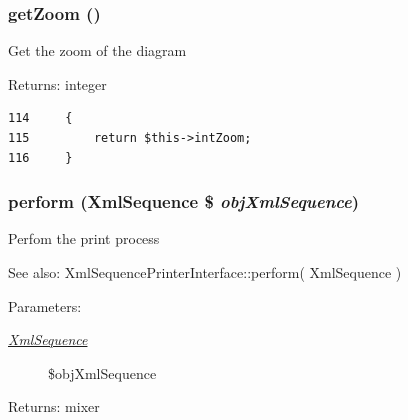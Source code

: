 \hypertarget{class_xml_sequence_printer_diagram_f14ce9063b029367062cfca60b3236af}{
\subsubsection[{getZoom}]{\setlength{\rightskip}{0pt plus 5cm}getZoom ()}}
\label{class_xml_sequence_printer_diagram_f14ce9063b029367062cfca60b3236af}


Get the zoom of the diagram

\begin{Desc}
\item[Returns:]integer \end{Desc}


\begin{Code}\begin{verbatim}114     {
115         return $this->intZoom;
116     }
\end{verbatim}
\end{Code}


\hypertarget{class_xml_sequence_printer_diagram_7a8a4630e9f25847da0a6de87a5ab7e0}{
\subsubsection[{perform}]{\setlength{\rightskip}{0pt plus 5cm}perform ({\bf XmlSequence} \$ {\em objXmlSequence})}}
\label{class_xml_sequence_printer_diagram_7a8a4630e9f25847da0a6de87a5ab7e0}


Perfom the print process

\begin{Desc}
\item[See also:]XmlSequencePrinterInterface::perform( XmlSequence ) \end{Desc}
\begin{Desc}
\item[Parameters:]
\begin{description}
\item[{\em \hyperlink{class_xml_sequence}{XmlSequence}}]\$objXmlSequence \end{description}
\end{Desc}
\begin{Desc}
\item[Returns:]mixer \end{Desc}


